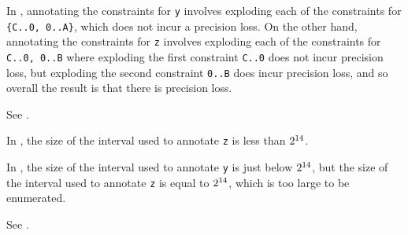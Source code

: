 

In , annotating the constraints for \verb|y|
involves exploding each of the constraints for \verb|{C..0, 0..A}|,
which does not incur a precision loss.
On the other hand, annotating the constraints for \verb|z|
involves exploding each of the constraints for \verb|C..0, 0..B|
where exploding the first constraint \verb|C..0| does not incur precision loss,
but exploding the second constraint \verb|0..B| does incur precision loss,
and so overall the result is that there is precision loss.




See .




In , the size of the interval used to annotate
\verb|z| is less than $2^{14}$.

In , the size of the interval used to annotate
\verb|y| is just below $2^{14}$, but the size of the interval
used to annotate \verb|z| is equal to $2^{14}$, which is too
large to be enumerated.



See .



